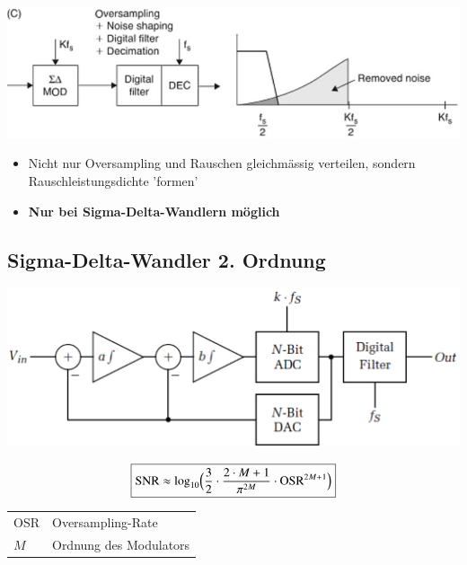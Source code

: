 \begin{minipage}[c]{0.48\columnwidth}
    \includegraphics[width=\columnwidth]{images/rauschen_mit_oversampling_und_noise_shaping.png}
\end{minipage}
\hfill
\begin{minipage}[c]{0.48\columnwidth}
    \begin{itemize}
        \item Nicht nur Oversampling und Rauschen gleichmässig verteilen, sondern Rauschleistungsdichte 'formen'
        \item \textbf{Nur bei Sigma-Delta-Wandlern möglich}
    \end{itemize}
\end{minipage}


\subsection{Sigma-Delta-Wandler 2. Ordnung}

\begin{minipage}[c]{0.48\columnwidth}
    \includegraphics[width=\columnwidth]{images/sigma-delta-wandler_ordnung_2.png}
\end{minipage}
\hfill
\begin{minipage}[c]{0.48\columnwidth}
    $$ \boxed{ \text{SNR} \approx \log_{10} \Bigl( \frac{3}{2} \cdot \frac{2 \cdot M + 1}{\pi^{2M}} \cdot \text{OSR}^{2M+1} \Bigr) } $$
    \begin{tabular}{ll}
        OSR & Oversampling-Rate \\
        $M$ & Ordnung des Modulators
    \end{tabular}
\end{minipage}

